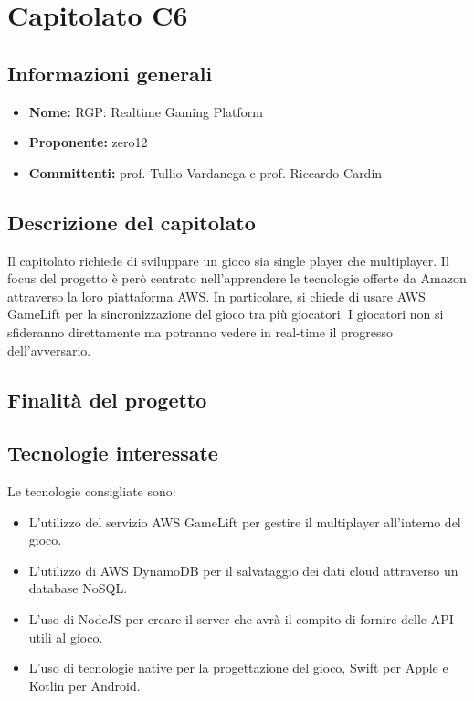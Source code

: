 \section{Capitolato C6}

\subsection{Informazioni generali}
\begin{itemize}
\item \textbf{Nome:} RGP: Realtime Gaming Platform
\item \textbf{Proponente:} zero12
\item \textbf{Committenti:} prof. Tullio Vardanega e prof. Riccardo Cardin
\end{itemize}

\subsection{Descrizione del capitolato}
Il capitolato richiede di sviluppare un gioco sia single player che multiplayer.
Il focus del progetto è però centrato nell'apprendere le tecnologie offerte da Amazon attraverso la loro piattaforma AWS.
In particolare, si chiede di usare AWS GameLift per la sincronizzazione del gioco tra più giocatori.
I giocatori non si sfideranno direttamente ma potranno vedere in real-time il progresso dell'avversario.

\subsection{Finalità del progetto}

\subsection{Tecnologie interessate}
Le tecnologie consigliate sono:
\begin{itemize}
\item L'utilizzo del servizio AWS GameLift per gestire il multiplayer all'interno del gioco.
\item L'utilizzo di AWS DynamoDB per il salvataggio dei dati cloud attraverso un database NoSQL.
\item L'uso di NodeJS per creare il server che avrà il compito di fornire delle API utili al gioco.
\item L'uso di tecnologie native per la progettazione del gioco, Swift per Apple e Kotlin per Android.
\end{itemize}

